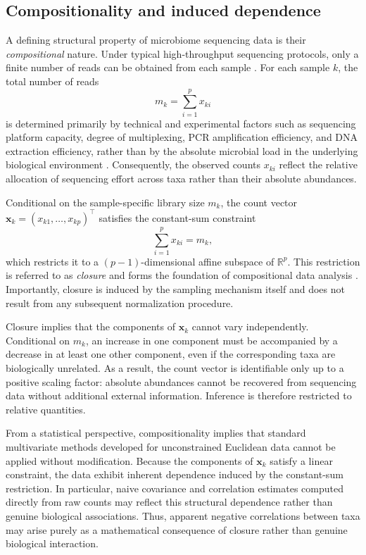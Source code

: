 \subsection{Compositionality and induced dependence}
\label{sec:2micro:charact:compositionality}

A defining structural property of microbiome sequencing data is their \emph{compositional} nature. 
Under typical high-throughput sequencing protocols, only a finite number of reads can be obtained from each sample \citep{gloor2017microbiome}. 
For each sample $k$, the total number of reads
\begin{equation}
    m_k = \sum_{i=1}^{p} x_{ki}
\end{equation}
is determined primarily by technical and experimental factors such as sequencing platform capacity, degree of multiplexing, PCR amplification efficiency, and DNA extraction efficiency, rather than by the absolute microbial load in the underlying biological environment \citep{nearing2021identifying}. 
Consequently, the observed counts $x_{ki}$ reflect the relative allocation of sequencing effort across taxa rather than their absolute abundances.

Conditional on the sample-specific library size $m_k$, the count vector $\mathbf{x}_k = (x_{k1}, \dots, x_{kp})^\top$ satisfies the constant-sum constraint
\begin{equation}
\sum_{i=1}^{p} x_{ki} = m_k,
\end{equation}
which restricts it to a $(p-1)$-dimensional affine subspace of $\mathbb{R}^{p}$.
This restriction is referred to as \emph{closure} and forms the foundation of compositional data analysis \citep{aitchison1982statistical,gloor2016its}. 
Importantly, closure is induced by the sampling mechanism itself and does not result from any subsequent normalization procedure.

Closure implies that the components of $\mathbf{x}_k$ cannot vary independently. 
Conditional on $m_k$, an increase in one component must be accompanied by a decrease in at least one other component, even if the corresponding taxa are biologically unrelated.
As a result, the count vector is identifiable only up to a positive scaling factor: absolute abundances cannot be recovered from sequencing data without additional external information. 
Inference is therefore restricted to relative quantities.

From a statistical perspective, compositionality implies that standard multivariate methods developed for unconstrained Euclidean data cannot be applied without modification. 
Because the components of $\mathbf{x}_k$ satisfy a linear constraint, the data exhibit inherent dependence induced by the constant-sum restriction. 
In particular, naive covariance and correlation estimates computed directly from raw counts may reflect this structural dependence rather than genuine biological associations. 
Thus, apparent negative correlations between taxa may arise purely as a mathematical consequence of closure rather than genuine biological interaction.

